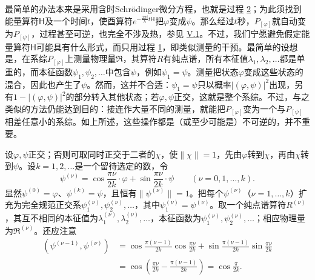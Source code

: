 \documentclass[fontsize=13pt,twoside,openany,headings=normal,parskip=false,bookmarkpackage=false,DIV=calc]{scrbook}
\begin{document}
最简单的办法本来是采用含时Schr\"odinger微分方程，也就是过程 \hyperref[eq:V.1.2]{2}；为此须找到能量算符$\mathsf{H}$及一个时间$t$，使酉算符$e^{-\frac{2\pi i}{h}t\mathsf{H}}$把$\varphi$变成$\psi$。那么经过$t$秒，$P_{[\varphi]}$就自动变为$P_{[\psi]}$，过程甚至可逆，也完全不涉及热，参见 \hyperref[sec:V.1]{V.1}。不过，我们宁愿避免假定能量算符$\mathsf{H}$可能具有什么形式，而只用过程 \hyperref[eq:V.1.1]{1}，即类似测量的干预。最简单的设想是，在系综$P_{[\varphi]}$上测量物理量$\mathfrak R$，其算符$R$有纯点谱，所有本征值$\lambda_1,\allowbreak \lambda_2,\allowbreak \ldots$都是单重的，而本征函数$\psi_1,\allowbreak \psi_2,\allowbreak \ldots$中包含$\psi$，例如$\psi_1=\psi$。测量把状态$\varphi$变成这些状态的混合，因此也产生了$\psi$。然而，这并不合适：$\psi_1=\psi$只以概率$|(\varphi,\allowbreak \psi)|^2$出现，另有$1-|(\varphi,\allowbreak \psi)|^2$的部分转入其他状态；若$\varphi,\allowbreak \psi$正交，这就是整个系综。不过，与之类似的\hypertarget{origpage-195}{}\label{origpage-195}方法仍能达到目的：接连作大量不同的测量，就能把$P_{[\varphi]}$变为一个与$P_{[\psi]}$相差任意小的系综。如上所述，这些操作都是（或至少可能是）不可逆的，并不重要。

设$\varphi,\allowbreak \psi$正交；否则可取同时正交于二者的$\chi$，使$\|\chi\|=1$，先由$\varphi$转到$\chi$，再由$\chi$转到$\psi$。设$k=1,\allowbreak 2,\allowbreak \ldots$是一个留待选定的数，令
\[
\psi^{(\nu)}=\cos\frac{\pi\nu}{2k}\cdot\varphi+\sin\frac{\pi\nu}{2k}\cdot\psi
\qquad(\nu=0,1,\ldots,k).
\]
显然$\psi^{(0)}=\varphi$、$\psi^{(k)}=\psi$，且恒有$\|\psi^{(\nu)}\|=1$。把每个$\psi^{(\nu)}$（$\nu=1,\allowbreak \ldots,\allowbreak k$）扩充为完全规范正交系$\psi_1^{(\nu)},\allowbreak \psi_2^{(\nu)},\allowbreak \ldots$，其中$\psi_1^{(\nu)}=\psi^{(\nu)}$。取一个纯点谱算符$R^{(\nu)}$，其互不相同的本征值为$\lambda_1^{(\nu)},\allowbreak \lambda_2^{(\nu)},\allowbreak \ldots$，本征函数为$\psi_1^{(\nu)},\allowbreak \psi_2^{(\nu)},\allowbreak \ldots$；相应物理量为$\mathfrak R^{(\nu)}$。还应注意
\begin{align*}
(\psi^{(\nu-1)},\psi^{(\nu)})
&=\cos\frac{\pi(\nu-1)}{2k}\cos\frac{\pi\nu}{2k}
+\sin\frac{\pi(\nu-1)}{2k}\sin\frac{\pi\nu}{2k}\\
&=\cos\left(\frac{\pi\nu}{2k}-\frac{\pi(\nu-1)}{2k}\right)=\cos\frac\pi{2k}.
\end{align*}
\end{document}
